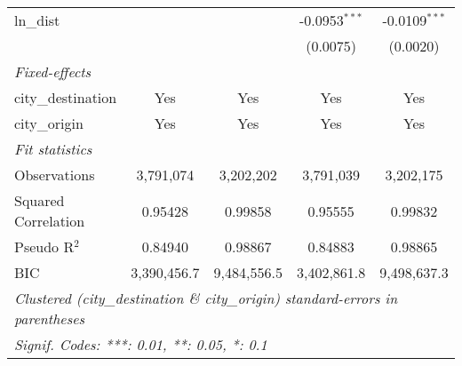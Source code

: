 \begin{tabular}{lcccc}
   ln\_dist                          &                &                & -0.0953$^{***}$ & -0.0109$^{***}$\\   
                                     &                &                & (0.0075)        & (0.0020)\\   
   \midrule
   \emph{Fixed-effects}\\
   city\_destination                 & Yes            & Yes            & Yes             & Yes\\  
   city\_origin                      & Yes            & Yes            & Yes             & Yes\\  
   \midrule
   \emph{Fit statistics}\\
   Observations                      & 3,791,074      & 3,202,202      & 3,791,039       & 3,202,175\\  
   Squared Correlation               & 0.95428        & 0.99858        & 0.95555         & 0.99832\\  
   Pseudo R$^2$                      & 0.84940        & 0.98867        & 0.84883         & 0.98865\\  
   BIC                               & 3,390,456.7    & 9,484,556.5    & 3,402,861.8     & 9,498,637.3\\  
   \midrule \midrule
   \multicolumn{5}{l}{\emph{Clustered (city\_destination \& city\_origin) standard-errors in parentheses}}\\
   \multicolumn{5}{l}{\emph{Signif. Codes: ***: 0.01, **: 0.05, *: 0.1}}\\
\end{tabular}
\par\endgroup




